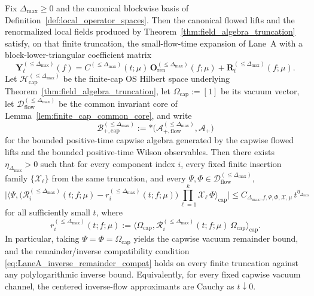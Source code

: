 \begin{corollary}\label{cor:finite_truncation_SFTE}
Fix $\Delta_{\max}\ge 0$ and the canonical blockwise basis of Definition~\ref{def:local_operator_spaces}.
Then the canonical flowed lifts and the renormalized local fields produced by Theorem~\ref{thm:field_algebra_truncation} satisfy, on that finite truncation, the small-flow-time expansion of Lane~A with a block-lower-triangular coefficient matrix
\[
\mathbf Y_t^{(\le \Delta_{\max})}(f)
=
C^{(\le \Delta_{\max})}(t;\mu)\,\mathbf O_{\mathrm{ren}}^{(\le \Delta_{\max})}(f;\mu)
+\mathbf R_t^{(\le \Delta_{\max})}(f;\mu).
\]
Let $\mathcal H^{(\le \Delta_{\max})}_{\mathrm{cap}}$ be the finite-cap OS Hilbert space underlying Theorem~\ref{thm:field_algebra_truncation}, let $\Omega_{\mathrm{cap}}:=[1]$ be its vacuum vector, let
$\mathcal D^{(\le \Delta_{\max})}_{\mathrm{flow}}$ be the common invariant core of Lemma~\ref{lem:finite_cap_common_core}, and write
\[
\mathcal B^{(\le \Delta_{\max})}_{+,\mathrm{cap}}
:=
\ast\!\bigl(\mathcal A^{(\le \Delta_{\max})}_{+,\mathrm{flow}},\mathcal A_+\bigr)
\]
for the bounded positive-time capwise algebra generated by the capwise flowed lifts and the bounded positive-time Wilson observables.
Then there exists $\eta_{\Delta_{\max}}>0$ such that for every component index $i$, every fixed finite insertion family $\{\mathcal X_\ell\}$ from the same truncation, and every
$\Psi,\Phi\in\mathcal D^{(\le \Delta_{\max})}_{\mathrm{flow}}$,
\[
\Big|
\big\langle
\Psi,
\big(\mathcal R^{(\le \Delta_{\max})}_i(t;f;\mu)-r^{(\le \Delta_{\max})}_i(t;f;\mu)\big)
\prod_{\ell=1}^k \mathcal X_\ell\,\Phi
\big\rangle_{\mathrm{cap}}
\Big|
\le C_{\Delta_{\max},f,\Psi,\Phi,\mathcal X,\mu}\,t^{\eta_{\Delta_{\max}}}
\]
for all sufficiently small $t$, where
\[
r^{(\le \Delta_{\max})}_i(t;f;\mu)
:=
\big\langle \Omega_{\mathrm{cap}},\mathcal R^{(\le \Delta_{\max})}_i(t;f;\mu)\,\Omega_{\mathrm{cap}}\big\rangle_{\mathrm{cap}}.
\]
In particular, taking $\Psi=\Phi=\Omega_{\mathrm{cap}}$ yields the capwise vacuum remainder bound, and the remainder/inverse compatibility condition
\eqref{eq:LaneA_inverse_remainder_compat} holds on every finite truncation against any polylogarithmic inverse bound.
Equivalently, for every fixed capwise vacuum channel, the centered inverse-flow approximants are Cauchy as $t\downarrow 0$.


\end{corollary}
